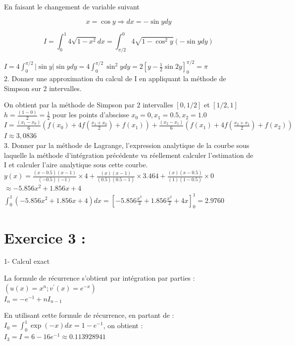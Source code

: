 \documentclass[10pt]{article}
\begin{document}
En faisant le changement de variable suivant

\[
x=\cos y \Rightarrow d x=-\sin y d y
\]

\[
I=\int_{0}^{1} 4 \sqrt{1-x^{2}} d x=\int_{\pi / 2}^{0} 4 \sqrt{1-\cos ^{2} y}(-\sin y d y)
\]

\(I=4 \int_{0}^{\pi / 2}|\sin y| \sin y d y=4 \int_{0}^{\pi / 2} \sin ^{2} y d y=2\left[y-\frac{1}{2} \sin 2 y\right]_{0}^{\pi / 2}=\pi\)\\
2. Donner une approximation du calcul de I en appliquant la méthode de Simpson sur 2 intervalles.

On obtient par la méthode de Simpson par 2 intervalles \([0,1 / 2]\) et \([1 / 2,1]\)\\
\(h=\frac{(1-0)}{2}=\frac{1}{2}\) pour les points d'abscisse \(x_{0}=0, x_{1}=0.5, x_{2}=1.0\)\\
\(I=\frac{\left(x_{1}-x_{0}\right)}{6}\left(f\left(x_{0}\right)+4 f\left(\frac{x_{1}+x_{0}}{2}\right)+f\left(x_{1}\right)\right)+\frac{\left(x_{2}-x_{1}\right)}{6}\left(f\left(x_{1}\right)+4 f\left(\frac{x_{2}+x_{1}}{2}\right)+f\left(x_{2}\right)\right)\)\\
\(I \approx 3,0836\)\\
3. Donner par la méthode de Lagrange, l'expression analytique de la courbe sous laquelle la méthode d'intégration précédente va réellement calculer l'estimation de I et calculer l'aire analytique sous cette courbe.\\
\(y(x)=\frac{(x-0.5)(x-1)}{(-0.5)(-1)} \times 4+\frac{(x)(x-1)}{(0.5)(0.5-1)} \times 3.464+\frac{(x)(x-0.5)}{(1)(1-0.5)} \times 0\)\\
\(\approx-5.856 x^{2}+1.856 x+4\)\\
\(\int_{0}^{1}\left(-5.856 x^{2}+1.856 x+4\right) d x=\left[-5.856 \frac{x^{3}}{3}+1.856 \frac{x^{2}}{2}+4 x\right]_{0}^{1}=2.9760\)

\section*{Exercice 3 :}
1- Calcul exact

La formule de récurrence s'obtient par intégration par parties :\\
\(\left(u(x)=x^{n} ; v^{\prime}(x)=e^{-x}\right)\)\\
\(I_{n}=-e^{-1}+n I_{n-1}\)

En utilisant cette formule de récurrence, en partant de : \(I_{0}=\int_{0}^{1} \exp (-x) d x=1-e^{-1}\), on obtient :\\
\(I_{3}=I=6-16 e^{-1} \approx 0.113928941\)
\end{document}
